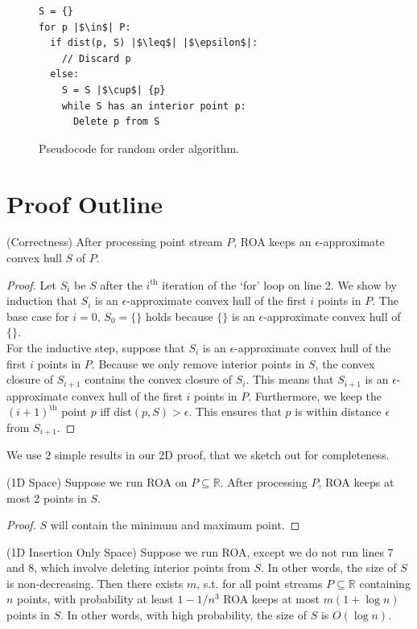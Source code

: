 \begin{figure}
\begin{lstlisting}[escapechar=|]
S = {}
for p |$\in$| P:
  if dist(p, S) |$\leq$| |$\epsilon$|:
    // Discard p
  else:
    S = S |$\cup$| {p}
    while S has an interior point p:
      Delete p from S
\end{lstlisting}
\caption{Pseudocode for random order algorithm.}
\end{figure}

\section{Proof Outline}

\begin{theorem}
(Correctness) After processing point stream $P$, ROA keeps an $\epsilon$-approximate convex hull $S$ of $P$.
\end{theorem}

\begin{proof}
Let $S_i$ be $S$ after the $i^{\mbox{th}}$ iteration of the `for' loop on line 2. We show by induction that $S_i$ is an $\epsilon$-approximate convex hull of the first $i$ points in $P$. The base case for $i = 0$, $S_0 = \{\}$ holds because $\{\}$ is an $\epsilon$-approximate convex hull of $\{\}$.
\\

For the inductive step, suppose that $S_i$ is an $\epsilon$-approximate convex hull of the first $i$ points in $P$. Because we only remove interior points in $S$, the convex closure of $S_{i+1}$ contains the convex closure of $S_i$. This means that $S_{i+1}$ is an $\epsilon$-approximate convex hull of the first $i$ points in $P$. Furthermore, we keep the $(i+1)^{\mbox{th}}$ point $p$ iff dist$(p, S) > \epsilon$. This ensures that $p$ is within distance $\epsilon$ from $S_{i+1}$.
\end{proof}

We use 2 simple results in our 2D proof, that we sketch out for completeness.

\begin{lemma}
(1D Space) Suppose we run ROA on $P \subseteq \mathbb{R}$. After processing $P$, ROA keeps at most 2 points in $S$.
\end{lemma}

\begin{proof}
$S$ will contain the minimum and maximum point.
\end{proof}

\begin{lemma}
(1D Insertion Only Space) Suppose we run ROA, except we do not run lines 7 and 8, which involve deleting interior points from $S$. In other words, the size of $S$ is non-decreasing. Then there exists $m$, s.t. for all point streams $P \subseteq \mathbb{R}$ containing $n$ points, with probability at least $1 - 1/n^3$ ROA keeps at most $m(1 + \log{n})$ points in $S$. In other words, with high probability, the size of $S$ is $O(\log{n})$.
\end{lemma}

